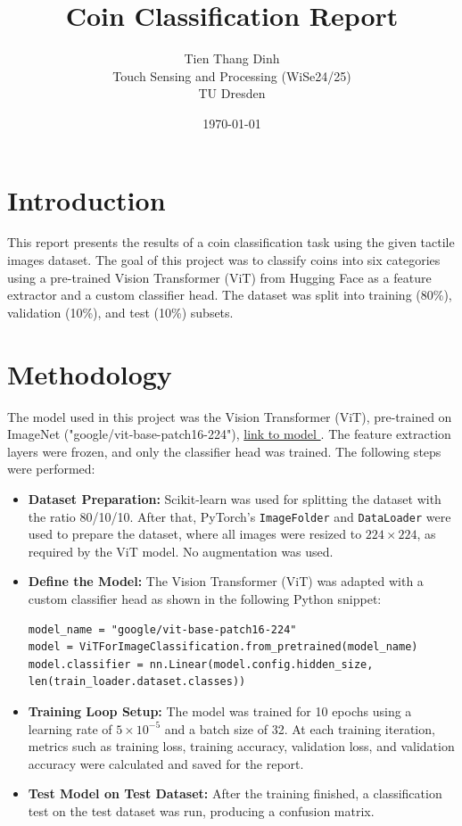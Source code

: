 \documentclass[a4paper,12pt]{article}
\title{Coin Classification Report}
\author{Tien Thang Dinh \\ Touch Sensing and Processing (WiSe24/25) \\ TU Dresden}
\date{\today}
\begin{document}
\maketitle

\section*{Introduction}
This report presents the results of a coin classification task using the given tactile images dataset. The goal of this project was to classify coins into six categories using a pre-trained Vision Transformer (ViT) from Hugging Face as a feature extractor and a custom classifier head. The dataset was split into training (80\%), validation (10\%), and test (10\%) subsets.

\section*{Methodology}
The model used in this project was the Vision Transformer (ViT), pre-trained on ImageNet ("google/vit-base-patch16-224"), \href{https://huggingface.co/google/vit-base-patch16-224}{link to model }. The feature extraction layers were frozen, and only the classifier head was trained. The following steps were performed:
\begin{itemize}
    \item \textbf{Dataset Preparation:} Scikit-learn was used for splitting the dataset with the ratio 80/10/10. After that, PyTorch's \texttt{ImageFolder} and \texttt{DataLoader} were used to prepare the dataset, where all images were resized to $224 \times 224$, as required by the ViT model. No augmentation was used.
    
    \item \textbf{Define the Model:}
The Vision Transformer (ViT) was adapted with a custom classifier head as shown in the following Python snippet:
\begin{lstlisting}[style=mypython]
model_name = "google/vit-base-patch16-224"
model = ViTForImageClassification.from_pretrained(model_name)
model.classifier = nn.Linear(model.config.hidden_size, len(train_loader.dataset.classes))
\end{lstlisting}


    \item \textbf{Training Loop Setup:} The model was trained for 10 epochs using a learning rate of $5 \times 10^{-5}$ and a batch size of 32. At each training iteration, metrics such as training loss, training accuracy, validation loss, and validation accuracy were calculated and saved for the report.

    \item \textbf{Test Model on Test Dataset:} After the training finished, a classification test on the test dataset was run, producing a confusion matrix.
\end{itemize}
\end{document}
